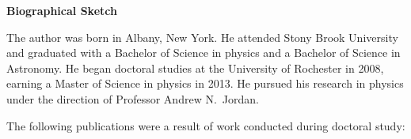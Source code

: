 \thispagestyle{plain}
\clearpage
\begin{center}
  \textbf{Biographical Sketch}
\end{center}

The author was born in Albany, New York.  He attended Stony Brook University and graduated with a Bachelor of Science in physics and a Bachelor of Science in Astronomy.  He began doctoral studies at the University of Rochester in 2008, earning a Master of Science in physics in 2013.  He pursued his research in physics under the direction of Professor Andrew N.~Jordan.

The following publications were a result of work conducted during doctoral study:
\vspace{1cm}




